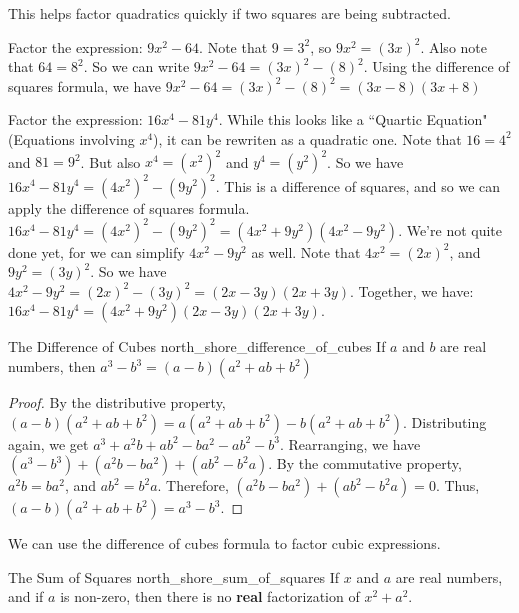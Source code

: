 \documentclass[crop=false,class=book,oneside]{standalone}                      %
\begin{document}
        \begin{remark}
            This helps factor quadratics quickly if two
            squares are being subtracted.
        \end{remark}
        \begin{fexample}{}{}
            Factor the expression: $9x^{2}-64$.
            Note that $9=3^{2}$, so $9x^{2}=(3x)^{2}$.
            Also note that $64=8^{2}$. So we can write
            $9x^{2}-64=(3x)^{2}-(8)^{2}$.
            Using the difference of squares formula,
            we have $9x^{2}-64=(3x)^{2}-(8)^{2}=(3x-8)(3x+8)$
        \end{fexample}
        \begin{fexample}{}{}
        Factor the expression: $16x^{4}-81y^{4}$. While this looks like a ``Quartic Equation" (Equations involving $x^4$), it can be rewriten as a quadratic one. Note that $16=4^{2}$ and $81=9^{2}$. But also $x^{4}=(x^{2})^{2}$ and $y^{4}=(y^{2})^{2}$. So we have $16x^{4}-81y^{4}=(4x^{2})^{2}-(9y^{2})^{2}$. This is a difference of squares, and so we can apply the difference of squares formula. $16x^{4}-81y^{4}=(4x^{2})^{2}-(9y^{2})^{2}=(4x^{2}+9y^{2})(4x^{2}-9y^{2})$. We're not quite done yet, for we can simplify $4x^{2}-9y^{2}$ as well. Note that $4x^{2}=(2x)^{2}$, and $9y^{2}=(3y)^{2}$. So we have $4x^{2}-9y^{2}=(2x)^{2}-(3y)^{2}=(2x-3y)(2x+3y)$. Together, we have: $16x^{4}-81y^{4}=(4x^{2}+9y^{2})(2x-3y)(2x+3y)$.
        \end{fexample}
        \begin{ftheorem}{The Difference of Cubes}
                       {north_shore_difference_of_cubes}
            If $a$ and $b$ are real numbers,
            then $a^{3}-b^{3}=(a-b)(a^{2}+ab+b^{2})$
        \end{ftheorem}
        \begin{proof}
        By the distributive property, $(a-b)(a^{2}+ab+b^{2})=a(a^{2}+ab+b^{2})-b(a^{2}+ab+b^{2})$.
        Distributing again, we get $a^{3}+a^{2}b+ab^{2}-ba^{2}-ab^{2}-b^{3}$.
        Rearranging, we have $(a^{3}-b^{3})+(a^{2}b-ba^{2})+(ab^{2}-b^{2}a)$.
        By the commutative property, $a^{2}b=ba^{2}$, and $ab^{2}=b^{2}a$.
        Therefore, $(a^{2}b-ba^{2})+(ab^{2}-b^{2}a)=0$.
        Thus, $(a-b)(a^{2}+ab+b^{2})=a^{3}-b^{3}$.
        \end{proof}
        \begin{remark}
        We can use the difference of cubes formula to factor cubic expressions.
        \end{remark}
        \begin{ftheorem}{The Sum of Squares}
                       {north_shore_sum_of_squares}
            If $x$ and $a$ are real numbers, and if
            $a$ is non-zero, then there is no \textbf{real}
            factorization of $x^{2}+a^{2}$.
        \end{ftheorem}
\end{document}
